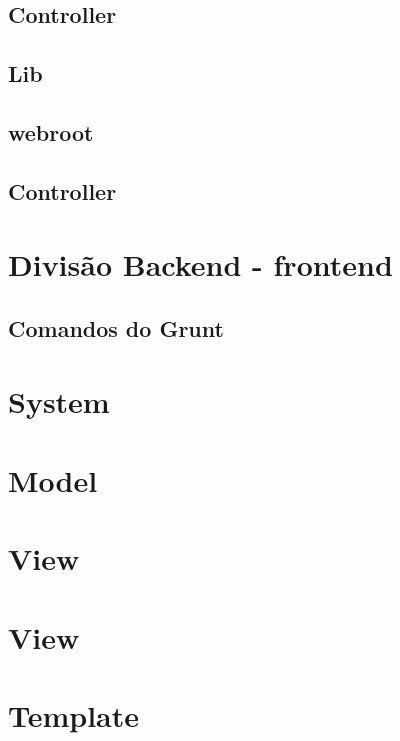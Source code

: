         \subsection{Controller\label{sec:app-controller}}

        \subsection{Lib\label{sec:app-lib}}

        \subsection{webroot\label{sec:app-lib}}


        \subsection{Controller\label{sec:app-controller}}


    \section{Divisão Backend - frontend\label{sec:back-front}}


        \subsection{Comandos do Grunt\label{sub:comandos-grunt}}

    \section{System\label{sec:estrutura-pastas}}

    \section{Model\label{sec:estrutura-pastas}}

    \section{View\label{sec:estrutura-pastas}}

    \section{View\label{sec:estrutura-pastas}}

    \section{Template\label{sec:estrutura-pastas}}
